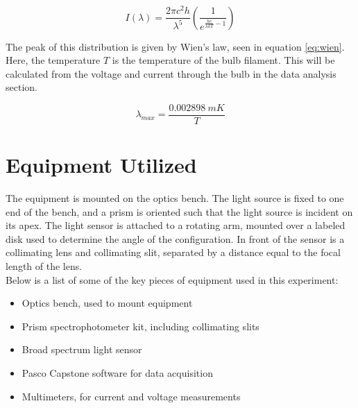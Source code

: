 \documentclass[a4paper]{article}
\begin{document}
\begin{equation}
\label{eq:planck_law}
I \left( \lambda \right) = 
\frac{2 \pi c^2 h}{\lambda^5}
\left( \frac{1}{e^{\frac{hc}{\lambda k T} - 1}} \right)
\end{equation}

\qq The peak of this distribution is given by Wien's law, seen in equation \ref{eq:wien}. Here, the temperature $T$ is the temperature of the bulb filament. This will be calculated from the voltage and current through the bulb in the data analysis section.

\begin{equation}
\label{eq:wien}
\lambda_{max} = \frac{0.002898 \: mK}{T}
\end{equation}

\section{Equipment Utilized}

\qq The equipment is mounted on the optics bench. The light source is fixed to one end of the bench, and a prism is oriented such that the light source is incident on its apex. The light sensor is attached to a rotating arm, mounted over a labeled disk used to determine the angle of the configuration. In front of the sensor is a collimating lens and collimating slit, separated by a distance equal to the focal length of the lens. \\

Below is a list of some of the key pieces of equipment used in this experiment:

\begin{itemize}
\item Optics bench, used to mount equipment
\item Prism spectrophotometer kit, including collimating slits
\item Broad spectrum light sensor
\item Pasco Capstone software for data acquisition
\item Multimeters, for current and voltage measurements
\end{itemize}

\begin{figure}[H]
\centering
\label{Diagram}
\end{figure}
\end{document}
